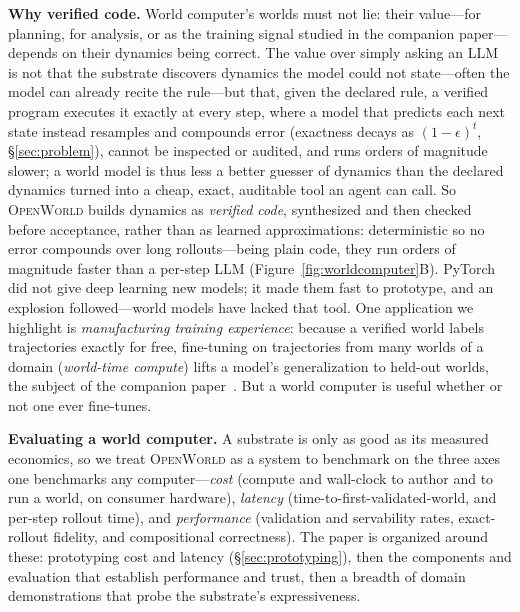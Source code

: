 \documentclass[11pt]{article}
\newcommand{\openworld}{\textsc{OpenWorld}}
\begin{document}
\textbf{Why verified code.} World computer's worlds must not lie: their value---for planning,
for analysis, or as the training signal studied in the companion paper---depends on their
dynamics being correct. The value over simply asking an LLM is not that the substrate
discovers dynamics the model could not state---often the model can already recite the
rule---but that, given the declared rule, a verified program executes it exactly at
every step, where a model that predicts each next state instead resamples and compounds error
(exactness decays as $(1-\epsilon)^t$, \S\ref{sec:problem}), cannot be inspected or audited, and
runs orders of magnitude slower; a world model is thus less a better guesser of dynamics
than the declared dynamics turned into a cheap, exact, auditable tool an agent can call. So
\openworld{} builds dynamics as \emph{verified code},
synthesized and then checked before acceptance, rather than as learned approximations: deterministic
so no error compounds over long rollouts---being plain code, they run orders of magnitude
faster than a per-step LLM (Figure~\ref{fig:worldcomputer}B). PyTorch did not give deep
learning new models; it made them fast to prototype, and an explosion followed---world
models have lacked that tool. One application we highlight is \emph{manufacturing training
experience}: because a verified world labels trajectories exactly for free, fine-tuning on
trajectories from many worlds of a domain (\emph{world-time compute}) lifts a model's
generalization to held-out worlds, the subject of the companion paper~\cite{openworld_wtc}. But
a world computer is useful whether or not one ever fine-tunes.

\textbf{Evaluating a world computer.} A substrate is only as good as its measured economics, so
we treat \openworld{} as a system to benchmark on the three axes one benchmarks any
computer---\emph{cost} (compute and wall-clock to author and to run a world, on consumer
hardware), \emph{latency} (time-to-first-validated-world, and per-step rollout time), and
\emph{performance} (validation and servability rates, exact-rollout fidelity, and compositional
correctness). The paper is organized around these: prototyping cost and latency
(\S\ref{sec:prototyping}), then the components and evaluation that establish performance and
trust, then a breadth of domain demonstrations that probe the substrate's expressiveness.
\end{document}
